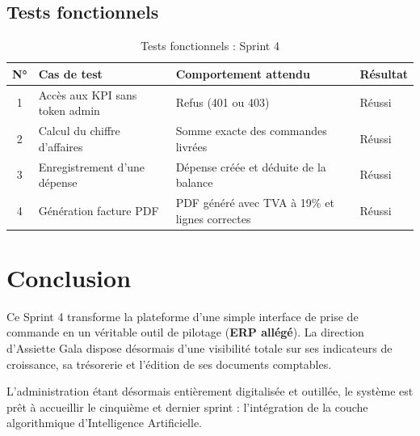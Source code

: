 \subsection{Tests fonctionnels}

\begin{table}[H]
    \centering
    \caption{Tests fonctionnels : Sprint 4}
    \label{tab:tests_sprint4}
    \renewcommand{\arraystretch}{1.3}
    \begin{tabular}{|c|p{4cm}|p{4cm}|p{2cm}|}
        \hline
        \textbf{N°} & \textbf{Cas de test} & \textbf{Comportement attendu} & \textbf{Résultat} \\
        \hline
        1 & Accès aux KPI sans token admin & Refus (401 ou 403) & Réussi \\
        \hline
        2 & Calcul du chiffre d'affaires & Somme exacte des commandes livrées & Réussi \\
        \hline
        3 & Enregistrement d'une dépense & Dépense créée et déduite de la balance & Réussi \\
        \hline
        4 & Génération facture PDF & PDF généré avec TVA à 19\% et lignes correctes & Réussi \\
        \hline
    \end{tabular}
\end{table}

\section*{Conclusion}

\begin{samepage}
Ce Sprint 4 transforme la plateforme d'une simple interface de prise de commande en un véritable outil de pilotage (\textbf{ERP allégé}). La direction d'Assiette Gala dispose désormais d'une visibilité totale sur ses indicateurs de croissance, sa trésorerie et l'édition de ses documents comptables.

L'administration étant désormais entièrement digitalisée et outillée, le système est prêt à accueillir le cinquième et dernier sprint : l'intégration de la couche algorithmique d'Intelligence Artificielle.
\end{samepage}

